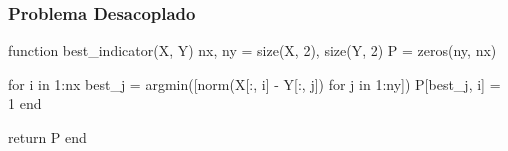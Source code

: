\begin{frame}[fragile]
  \frametitle{Problema Desacoplado}
  \begin{code}
    function best_indicator(X, Y)
      nx, ny = size(X, 2), size(Y, 2)
      P = zeros(ny, nx)

      for i in 1:nx
        best_j = argmin([norm(X[:, i] - Y[:, j]) for j in 1:ny])
        P[best_j, i] = 1
      end

      return P
    end
  \end{code}
\end{frame}
